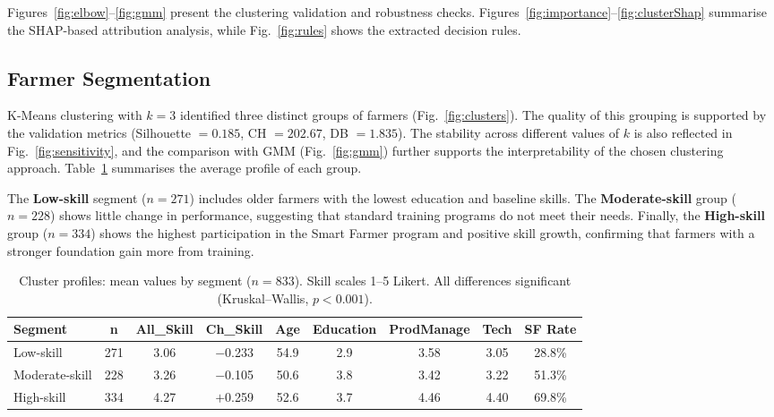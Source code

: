 \documentclass[fleqn,10pt,lineno]{wlpeerj}
\begin{document}
Figures~\ref{fig:elbow}--\ref{fig:gmm} present the clustering validation and robustness checks. 
Figures~\ref{fig:importance}--\ref{fig:clusterShap} summarise the SHAP-based attribution analysis, 
while Fig.~\ref{fig:rules} shows the extracted decision rules.

\subsection{Farmer Segmentation}

K-Means clustering with $k=3$ identified three distinct groups of farmers (Fig.~\ref{fig:clusters}). The quality of this grouping is supported by the validation metrics (Silhouette $= 0.185$, CH $= 202.67$, DB $= 1.835$). The stability across different values of $k$ is also reflected in Fig.~\ref{fig:sensitivity}, and the comparison with GMM (Fig.~\ref{fig:gmm}) further supports the interpretability of the chosen clustering approach. Table~\ref{tab:cluster_profile} summarises the average profile of each group.

The \textbf{Low-skill} segment ($n=271$) includes older farmers with the lowest education and baseline skills. The \textbf{Moderate-skill} group ($n=228$) shows little change in performance, suggesting that standard training programs do not meet their needs. Finally, the \textbf{High-skill} group ($n=334$) shows the highest participation in the Smart Farmer program and positive skill growth, confirming that farmers with a stronger foundation gain more from training.

\begin{table}[htbp]
\centering
\caption{Cluster profiles: mean values by segment ($n = 833$). Skill scales 1--5 Likert. All differences significant (Kruskal--Wallis, $p < 0.001$).}
\label{tab:cluster_profile}
\begin{tabular}{@{}lcccccccc@{}}
\toprule
\textbf{Segment} & \textbf{n} & \textbf{All\_Skill} & \textbf{Ch\_Skill} & \textbf{Age} & \textbf{Education} & \textbf{ProdManage} & \textbf{Tech} & \textbf{SF Rate} \\
\midrule
Low-skill      & 271 & 3.06 & $-$0.233 & 54.9 & 2.9 & 3.58 & 3.05 & 28.8\% \\
Moderate-skill & 228 & 3.26 & $-$0.105 & 50.6 & 3.8 & 3.42 & 3.22 & 51.3\% \\
High-skill     & 334 & 4.27 & $+$0.259 & 52.6 & 3.7 & 4.46 & 4.40 & 69.8\% \\
\bottomrule
\end{tabular}
\end{table}
\end{document}
